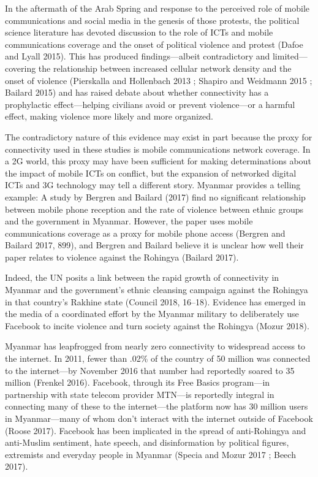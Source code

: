 \documentclass[
]{article}
\begin{document}
In the aftermath of the Arab Spring and response to the perceived role
of mobile communications and social media in the genesis of those
protests, the political science literature has devoted discussion to the
role of ICTs and mobile communications coverage and the onset of
political violence and protest (Dafoe and Lyall 2015). This has produced
findings---albeit contradictory and limited---covering the relationship
between increased cellular network density and the onset of violence
(Pierskalla and Hollenbach 2013 ; Shapiro and Weidmann 2015 ; Bailard
2015) and has raised debate about whether connectivity has a
prophylactic effect---helping civilians avoid or prevent violence---or a
harmful effect, making violence more likely and more organized.

The contradictory nature of this evidence may exist in part because the
proxy for connectivity used in these studies is mobile communications
network coverage. In a 2G world, this proxy may have been sufficient for
making determinations about the impact of mobile ICTs on conflict, but
the expansion of networked digital ICTs and 3G technology may tell a
different story. Myanmar provides a telling example: A study by Bergren
and Bailard (2017) find no significant relationship between mobile phone
reception and the rate of violence between ethnic groups and the
government in Myanmar. However, the paper uses mobile communications
coverage as a proxy for mobile phone access (Bergren and Bailard 2017,
899), and Bergren and Bailard believe it is unclear how well their paper
relates to violence against the Rohingya (Bailard 2017).

Indeed, the UN posits a link between the rapid growth of connectivity in
Myanmar and the government's ethnic cleansing campaign against the
Rohingya in that country's Rakhine state (Council 2018, 16--18).
Evidence has emerged in the media of a coordinated effort by the Myanmar
military to deliberately use Facebook to incite violence and turn
society against the Rohingya (Mozur 2018).

Myanmar has leapfrogged from nearly zero connectivity to widespread
access to the internet. In 2011, fewer than .02\% of the country of 50
million was connected to the internet---by November 2016 that number had
reportedly soared to 35 million (Frenkel 2016). Facebook, through its
Free Basics program---in partnership with state telecom provider
MTN---is reportedly integral in connecting many of these to the
internet---the platform now has 30 million users in Myanmar---many of
whom don't interact with the internet outside of Facebook (Roose 2017).
Facebook has been implicated in the spread of anti-Rohingya and
anti-Muslim sentiment, hate speech, and disinformation by political
figures, extremists and everyday people in Myanmar (Specia and Mozur
2017 ; Beech 2017).
\end{document}
